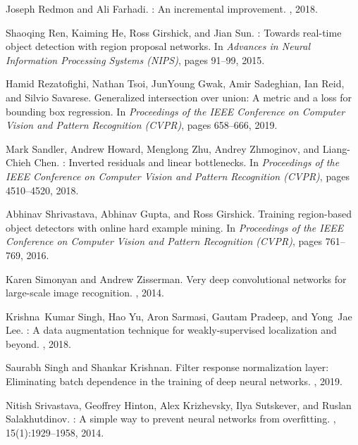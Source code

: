 \documentclass[10pt,twocolumn,letterpaper]{article}
\begin{document}
{\begin{thebibliography}{100}
	Joseph Redmon and Ali Farhadi.
	: An incremental improvement.
	, 2018.
	
	Shaoqing Ren, Kaiming He, Ross Girshick, and Jian Sun.
	: Towards real-time object detection with region
	proposal networks.
	\newblock In {\em Advances in Neural Information Processing Systems (NIPS)},
	pages 91--99, 2015.
	
	Hamid Rezatofighi, Nathan Tsoi, JunYoung Gwak, Amir Sadeghian, Ian Reid, and
	Silvio Savarese.
	\newblock Generalized intersection over union: A metric and a loss for bounding
	box regression.
	\newblock In {\em Proceedings of the IEEE Conference on Computer Vision and
		Pattern Recognition (CVPR)}, pages 658--666, 2019.
	
	Mark Sandler, Andrew Howard, Menglong Zhu, Andrey Zhmoginov, and Liang-Chieh
	Chen.
	: Inverted residuals and linear bottlenecks.
	\newblock In {\em Proceedings of the IEEE Conference on Computer Vision and
		Pattern Recognition (CVPR)}, pages 4510--4520, 2018.
	
	Abhinav Shrivastava, Abhinav Gupta, and Ross Girshick.
	\newblock Training region-based object detectors with online hard example
	mining.
	\newblock In {\em Proceedings of the IEEE Conference on Computer Vision and
		Pattern Recognition (CVPR)}, pages 761--769, 2016.
	
	Karen Simonyan and Andrew Zisserman.
	\newblock Very deep convolutional networks for large-scale image recognition.
	, 2014.
	
	Krishna~Kumar Singh, Hao Yu, Aron Sarmasi, Gautam Pradeep, and Yong~Jae Lee.
	: A data augmentation technique for weakly-supervised
	localization and beyond.
	, 2018.
	
	Saurabh Singh and Shankar Krishnan.
	\newblock Filter response normalization layer: Eliminating batch dependence in
	the training of deep neural networks.
	, 2019.
	
	Nitish Srivastava, Geoffrey Hinton, Alex Krizhevsky, Ilya Sutskever, and Ruslan
	Salakhutdinov.
	: A simple way to prevent neural networks from overfitting.
	, 15(1):1929--1958,
	2014.
	

\end{thebibliography}}
\end{document}
